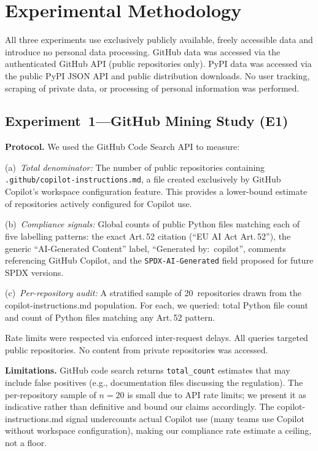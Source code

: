 \documentclass[conference]{IEEEtran}
\begin{document}
\section{Experimental Methodology}
\label{sec:methodology}

All three experiments use exclusively publicly available, freely
accessible data and introduce no personal data processing.  GitHub data
was accessed via the authenticated GitHub API (public repositories only).
PyPI data was accessed via the public PyPI JSON API and public
distribution downloads.  No user tracking, scraping of private data, or
processing of personal information was performed.

\subsection{Experiment~1---GitHub Mining Study (E1)}

\textbf{Protocol.}  We used the GitHub Code Search API to measure:

(a)~\emph{Total denominator:} The number of public repositories
containing \texttt{.github/copilot-instructions.md}, a file created
exclusively by GitHub Copilot's workspace configuration feature.  This
provides a lower-bound estimate of repositories actively configured for
Copilot use.

(b)~\emph{Compliance signals:} Global counts of public Python files
matching each of five labelling patterns: the exact Art.\,52 citation
(``EU AI Act Art.\,52''), the generic ``AI-Generated Content'' label,
``Generated by:~copilot'', comments referencing GitHub Copilot, and the
\texttt{SPDX-AI-Generated} field proposed for future SPDX versions.

(c)~\emph{Per-repository audit:} A stratified sample of 20~repositories
drawn from the copilot-instructions.md population.  For each, we
queried: total Python file count and count of Python files matching any
Art.\,52 pattern.

Rate limits were respected via enforced inter-request delays.  All
queries targeted public repositories.  No content from private
repositories was accessed.

\textbf{Limitations.}  GitHub code search returns \texttt{total\_count}
estimates that may include false positives (e.g., documentation files
discussing the regulation).  The per-repository sample of $n{=}20$ is
small due to API rate limits; we present it as indicative rather than
definitive and bound our claims accordingly.  The
copilot-instructions.md signal undercounts actual Copilot use (many
teams use Copilot without workspace configuration), making our compliance
rate estimate a ceiling, not a floor.
\end{document}
